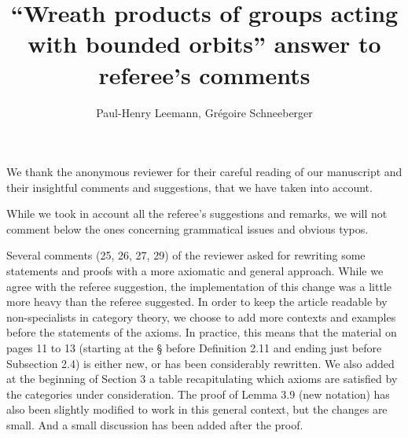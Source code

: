 \documentclass[english,a4paper]{article}
\title{``Wreath products of groups acting with bounded orbits'' answer to referee's comments}
\author{Paul-Henry Leemann, Grégoire Schneeberger}
\begin{document}
\maketitle
%
%
%
%
%
%
%
%
%
%
We thank the anonymous reviewer for their careful reading of our manuscript and their insightful comments and suggestions, that we have taken into account.

While we took in account all the referee’s suggestions and remarks, we will not comment below the ones concerning grammatical issues and obvious typos.

Several comments (25, 26, 27, 29) of the reviewer asked for rewriting some statements and proofs with a more axiomatic and general approach. While we agree with the referee suggestion, the implementation of this change was a little more heavy than the referee suggested. In order to keep the article readable by non-specialists in category theory, we choose to add more contexts and examples before the statements of the axioms.
In practice, this means that the material on pages 11 to 13 (starting at the § before Definition 2.11 and ending just before Subsection 2.4) is either new, or has been considerably rewritten.
We also added at the beginning of Section 3 a table recapitulating which axioms are satisfied by the categories under consideration.
The proof of Lemma 3.9 (new notation) has also been slightly modified to work in this general context, but the changes are small. And a small discussion has been added after the proof.
%
%
\end{document}
